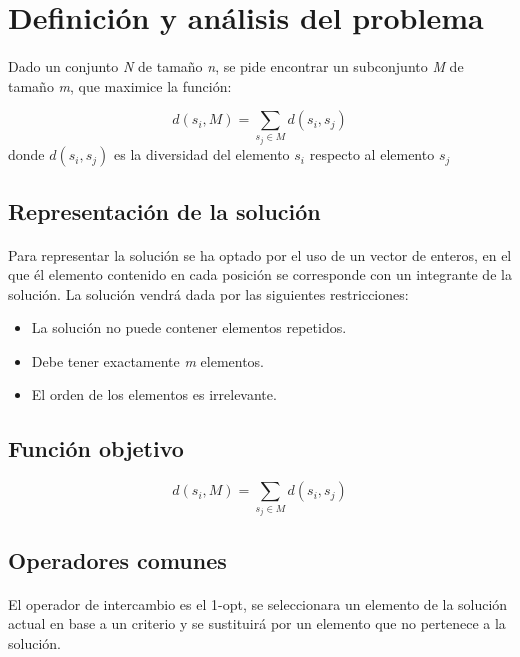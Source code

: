 \documentclass{article}
\begin{document}
	\section{Definición y análisis del problema}
	
	\paragraph{}Dado un conjunto \emph{N} de tamaño \emph{n}, se pide encontrar un subconjunto \emph{M} de tamaño \emph{m}, que maximice
	la función: 
	
	\[ d(s_i,M)=\sum_{s_j \in M} d(s_i,s_j)\]
	donde  $d(s_i,s_j)$ es la diversidad del elemento $s_i$ respecto al elemento $s_j$
	
	\subsection{Representación de la solución}
	
	\paragraph{} Para representar la solución se ha optado por el uso de un vector de enteros, en el que él elemento contenido en cada posición se corresponde con un integrante de la solución. La solución vendrá dada por las siguientes restricciones:
		\begin{itemize}
			
			\item La solución no puede contener elementos repetidos.
			
			\item Debe tener exactamente \emph{m} elementos.
			
			\item El orden de los elementos es irrelevante.
			
		\end{itemize}
	
	
	\subsection{Función objetivo}
	
	\[ d(s_i,M)=\sum_{s_j \in M} d(s_i,s_j)\]
	
	\subsection{Operadores comunes}
	
	\paragraph{}El operador de intercambio es el 1-opt, se seleccionara un elemento de la solución actual en base a un criterio y se sustituirá por un elemento que no pertenece a la solución. 
	
\end{document}
